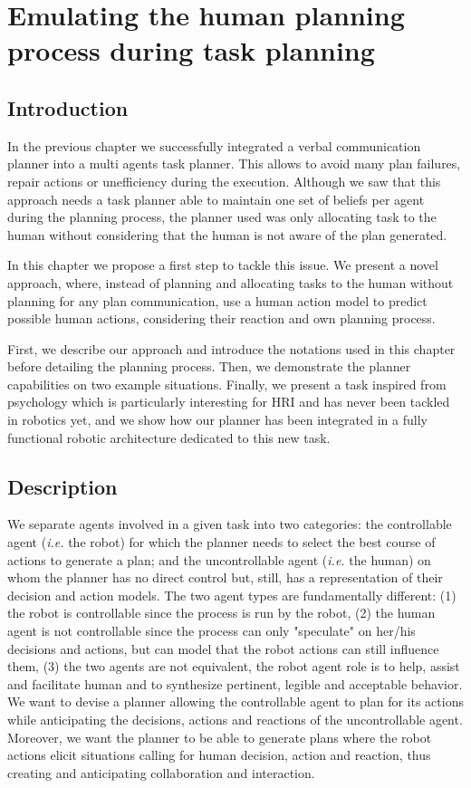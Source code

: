 \documentclass[a4paper,11pt,twoside]{StyleThese}
\begin{document}
\setcounter{chapter}{3} %
\dominitoc
\faketableofcontents
\fi

\chapter{Emulating the human planning process during task planning}
\label{chapter:doublehtn}
\minitoc

\section{Introduction}
In the previous chapter we successfully integrated a verbal communication planner into a multi agents task planner. This allows to avoid many plan failures, repair actions or unefficiency during the execution. Although we saw that this approach needs a task planner able to maintain one set of beliefs per agent during the planning process, the planner used was only allocating task to the human without considering that the human is not aware of the plan generated.

In this chapter we propose a first step to tackle this issue. We present a novel approach, where, instead of planning and allocating tasks to the human without planning for any plan communication, use a human action model to predict possible human actions, considering their reaction and own planning process.

First, we describe our approach and introduce the notations used in this chapter before detailing the planning process. Then, we demonstrate the planner capabilities on two example situations. Finally, we present a task inspired from psychology which is particularly interesting for HRI and has never been tackled in robotics yet, and we show how our planner has been integrated in a fully functional robotic architecture dedicated to this new task.

\section{Description}
We separate agents involved in a given task into two categories: the controllable agent (\textit{i.e.} the robot) for which the planner needs to select the best course of actions to generate a plan; and the uncontrollable agent (\textit{i.e.} the human) on whom the planner has no direct control but, still, has a representation of their decision and action models. The two agent types are fundamentally different: (1) the robot is controllable since the process is run by the robot, (2) the human agent is not controllable since the process can only "speculate" on her/his decisions and actions, but can model that the robot actions can still influence them, (3) the two agents are not equivalent, the robot agent role is to help, assist and facilitate human and to synthesize pertinent, legible and acceptable behavior.
We want to devise a planner allowing the controllable agent to plan for its actions while anticipating the decisions, actions and reactions of the uncontrollable agent. Moreover, we want the planner to be able to generate plans where the robot actions elicit situations calling for human decision, action and reaction, thus creating and anticipating collaboration and interaction.
\end{document}
